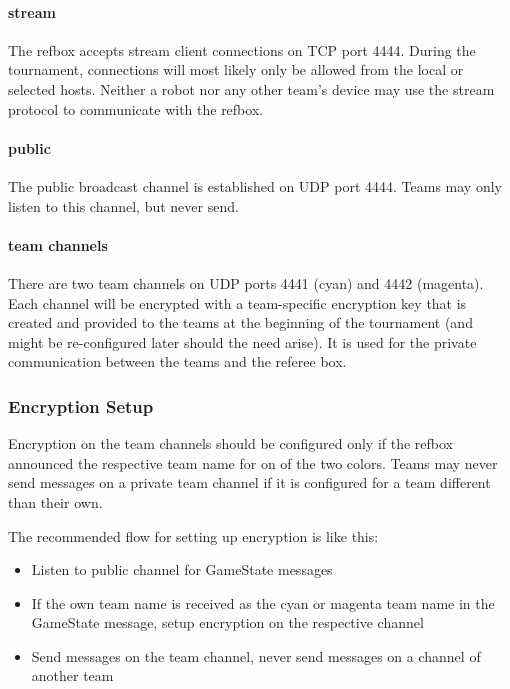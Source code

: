 \documentclass[a4paper]{article}
\begin{document}
\paragraph{stream}
The refbox accepts stream client connections on TCP port 4444. During
the tournament, connections will most likely only be allowed from the
local or selected hosts. Neither a robot nor any other team's device
may use the stream protocol to communicate with the refbox.

\paragraph{public}
The public broadcast channel is established on UDP port 4444. Teams
may only listen to this channel, but never send.

\paragraph{team channels}
There are two team channels on UDP ports 4441 (cyan) and 4442
(magenta). Each channel will be encrypted with a team-specific
encryption key that is created and provided to the teams at the
beginning of the tournament (and might be re-configured later should
the need arise). It is used for the private communication between the
teams and the referee box.

\subsubsection{Encryption Setup}
Encryption on the team channels should be configured only if the
refbox announced the respective team name for on of the two
colors. Teams may never send messages on a private team channel if it
is configured for a team different than their own.

The recommended flow for setting up encryption is like this:
\begin{itemize}
\item Listen to public channel for GameState messages
\item If the own team name is received as the cyan or magenta team
  name in the GameState message, setup encryption on the respective
  channel
\item Send messages on the team channel, never send messages on a
  channel of another team
\end{itemize}
\end{document}
